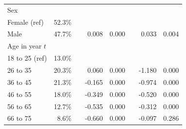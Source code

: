 \begin{table}[H]
\begin{adjustwidth}{-1in}{-1in}
\begin{tabular}{lrrrrrrr}
		Sex                                       &         &  &                          &                       &                      &                          &                       \\
		\hspace{2mm} Female (ref)                              & 52.3\%  &  &                          &                       &                      &                          &                       \\
		\hspace{2mm} Male                                      & 47.7\%  &  & 0.008                    & 0.000                 &                      & 0.033                    & 0.004                 \\
		Age in year $t$                             &         &  &                          &                       &                      &                          &                       \\
		\hspace{2mm} 18 to 25 (ref)                            & 13.0\%  &  &                          &                       &                      &                          &                       \\
		\hspace{2mm} 26 to 35                                  & 20.3\%  &  & 0.060                    & 0.000                 &                      & -1.180                   & 0.000                 \\
		\hspace{2mm} 36 to 45                                  & 21.3\%  &  & -0.165                   & 0.000                 &                      & -0.974                   & 0.000                 \\
		\hspace{2mm} 46 to 55                                  & 18.0\%  &  & -0.349                   & 0.000                 &                      & -0.520                   & 0.000                 \\
		\hspace{2mm} 56 to 65                                  & 12.7\%  &  & -0.535                   & 0.000                 &                      & -0.312                   & 0.000                 \\
		\hspace{2mm} 66 to 75                                  & 8.6\%   &  & -0.660                   & 0.000                 &                      & -0.097                   & 0.286                 \\

\end{tabular}
\end{adjustwidth}
\end{table}
